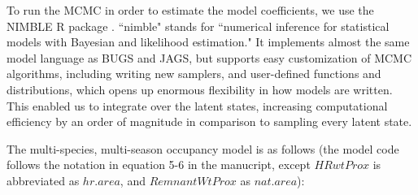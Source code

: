 \documentclass{article}\usepackage[]{graphicx}\usepackage[]{color}
\begin{document}
To run the MCMC in order to estimate the model coefficients, we use the
NIMBLE R package \citep{nimble-14, de2017programming}.  ``nimble"
stands for ``numerical inference for statistical models with Bayesian
and likelihood estimation."  It implements almost the same model
language as BUGS and JAGS, but supports easy customization of MCMC
algorithms, including writing new samplers, and user-defined functions
and distributions, which opens up enormous flexibility in how models
are written. This enabled us to integrate over the latent states,
increasing computational efficiency by an order of magnitude in
comparison to sampling every latent state. 


The multi-species, multi-season occupancy model is as follows (the
model code follows the notation in equation 5-6 in the manucript,
except $HRwtProx$ is abbreviated as $hr.area$, and $RemnantWtProx$ as
$nat.area$):
\end{document}
